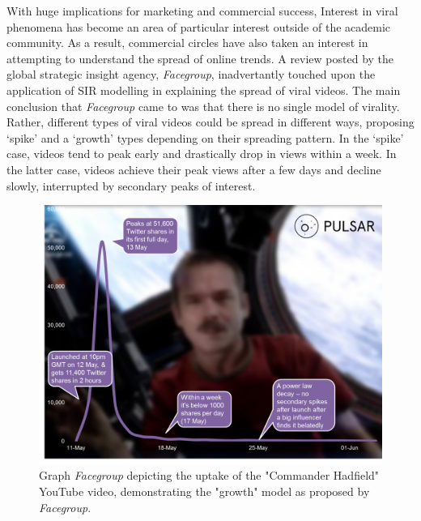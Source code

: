 With huge implications for marketing and commercial success, Interest in viral phenomena has become an area of particular interest outside of the academic community. As a result, commercial circles have also taken an interest in attempting to understand the spread of online trends. A review posted by the global strategic insight agency, \emph{Facegroup}, inadvertantly touched upon the application of SIR modelling in explaining the spread of viral videos.\cite{facegroup} The main conclusion that  \emph{Facegroup} came to was that there is no single model of virality. Rather, different types of viral videos could be spread in different ways, proposing `spike' and a `growth' types depending on their spreading pattern. In the `spike' case, videos tend to peak early and drastically drop in views within a week. In the latter case, videos achieve their peak views after a few days and decline slowly, interrupted by secondary peaks of interest. 
\newpage
\begin{figure}[ht!]
\centering
\includegraphics[width=120mm]{hatfield.png}
\caption{Graph \emph{Facegroup} depicting the uptake of the "Commander Hadfield" YouTube video, demonstrating the "growth" model as proposed by \emph{Facegroup}.\cite{facegroup}}
\label{sir}
\end{figure}

